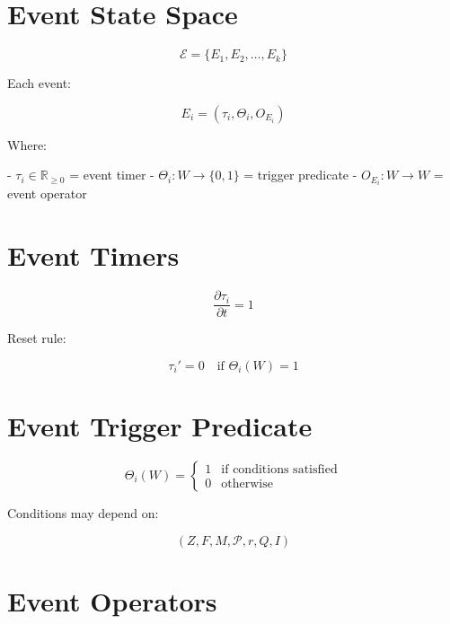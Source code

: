 
\section*{Event State Space}

\[
\mathcal{E} = \{E_1, E_2, \ldots, E_k\}
\]

Each event:

\[
E_i = (\tau_i, \Theta_i, O_{E_i})
\]

Where:

- \(\tau_i \in \mathbb{R}_{\ge 0}\) = event timer  
- \(\Theta_i : W \to \{0,1\}\) = trigger predicate  
- \(O_{E_i} : W \to W\) = event operator  


\section*{Event Timers}

\[
\frac{\partial \tau_i}{\partial t} = 1
\]

Reset rule:

\[
\tau_i' = 0 \quad \text{if } \Theta_i(W) = 1
\]


\section*{Event Trigger Predicate}

\[
\Theta_i(W)
=
\begin{cases}
1 & \text{if conditions satisfied} \\
0 & \text{otherwise}
\end{cases}
\]

Conditions may depend on:

\[
(Z, F, M, \mathcal{P}, r, Q, I)
\]


\section*{Event Operators}

